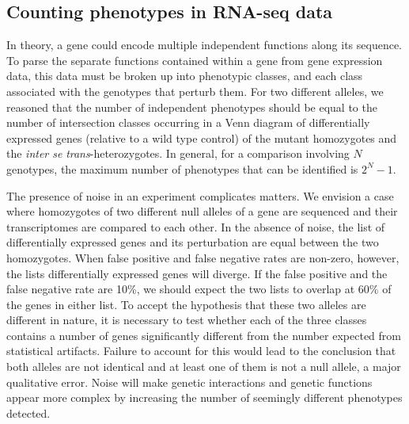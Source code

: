 \documentclass[10pt, twocolumn]{article}
\begin{document}
\subsection*{Counting phenotypes in RNA-seq data}
In theory, a gene could encode multiple independent functions along its
sequence. To parse the separate functions contained within a gene from gene
expression data, this data must be broken up into phenotypic classes, and each
class associated with the genotypes that perturb them. For two different
alleles, we reasoned that the number of independent
phenotypes should be equal to the number of intersection classes occurring in a
Venn diagram of differentially expressed genes (relative to a wild type control)
of the mutant homozygotes and the \emph{inter se} \emph{trans}-heterozygotes.
In general, for a comparison involving $N$ genotypes, the maximum number of
phenotypes that can be identified is $2^N-1$.

The presence of noise in an experiment complicates matters. We envision a case
where homozygotes of two different null alleles of a gene are sequenced and
their transcriptomes are compared to each other. In the absence of noise, the
list of differentially expressed genes and its perturbation are equal between
the two homozygotes. When false positive and false negative rates are non-zero,
however, the lists differentially expressed genes will diverge. If the false
positive and the false negative rate are 10\%, we should expect the two
lists to overlap at $60\%$ of the genes in either list. To accept the hypothesis
that these two alleles are different in nature, it is necessary to test whether
each of the three classes contains a number of genes significantly
different from the number expected from statistical artifacts. Failure to account
for this would lead to the conclusion that both alleles are not identical and at
least one of them is not a null allele, a major qualitative error. Noise will
make genetic interactions and genetic functions appear more complex by
increasing the number of seemingly different phenotypes detected.
\end{document}
